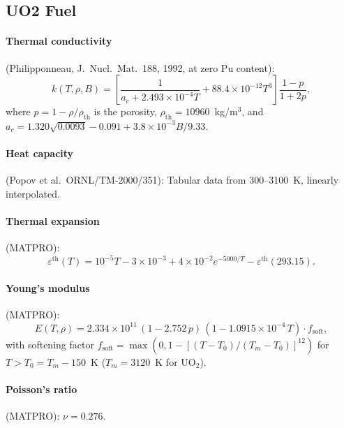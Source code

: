 \documentclass[11pt,a4paper]{article}
\begin{document}
\subsection{UO2 Fuel}

\paragraph{Thermal conductivity} (Philipponneau, J.~Nucl.~Mat.~188, 1992,
at zero Pu content):
\begin{equation}
  k(T, \rho, B) = \left[\frac{1}{a_c + 2.493\times10^{-4} T}
                        + 88.4\times10^{-12} T^3\right]
                  \frac{1-p}{1+2p},
\end{equation}
where $p = 1 - \rho/\rho_{\mathrm{th}}$ is the porosity,
$\rho_{\mathrm{th}} = 10960$~kg/m$^3$,
and $a_c = 1.320\sqrt{0.0093} - 0.091 + 3.8\times10^{-3} B/9.33$.

\paragraph{Heat capacity} (Popov et al.\ ORNL/TM-2000/351):
Tabular data from 300–3100~K, linearly interpolated.

\paragraph{Thermal expansion} (MATPRO):
\begin{equation}
  \varepsilon^{\mathrm{th}}(T) = 10^{-5} T - 3\times10^{-3} + 4\times10^{-2} e^{-5000/T}
                                 - \varepsilon^{\mathrm{th}}(293.15).
\end{equation}

\paragraph{Young's modulus} (MATPRO):
\begin{equation}
  E(T,\rho) = 2.334\times10^{11}\,(1 - 2.752\,p)\,(1 - 1.0915\times10^{-4}\,T) \cdot f_{\mathrm{soft}},
\end{equation}
with softening factor $f_{\mathrm{soft}}=\max(0, 1-[(T-T_0)/(T_m-T_0)]^{12})$
for $T > T_0 = T_m - 150$~K ($T_m = 3120$~K for UO$_2$).

\paragraph{Poisson's ratio} (MATPRO): $\nu = 0.276$.
\end{document}
